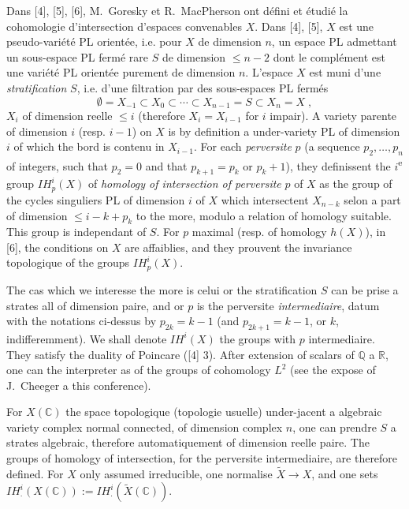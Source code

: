\documentclass[12pt,a4paper]{article}
\theoremstyle{plain}
\theoremstyle{definition}
\theoremstyle{remark}
\newcommand{\IH}{\mathit{IH}}
\newcommand{\CC}{\mathbb{C}}
\newcommand{\QQ}{\mathbb{Q}}
\newcommand{\RR}{\mathbb{R}}
\begin{document}
\medskip

Dans [4], [5], [6], M.~Goresky et R.~MacPherson ont défini et étudié la cohomologie d'intersection d'espaces convenables $X$. Dans [4], [5], $X$ est une pseudo-variété PL orientée, i.e. pour $X$ de dimension $n$, un espace PL admettant un sous-espace PL fermé rare $S$ de dimension $\leq n{-}2$ dont le complément est une variété PL orientée purement de dimension $n$. L'espace $X$ est muni d'une \emph{stratification} $S$, i.e. d'une filtration par des sous-espaces PL fermés
\[
\emptyset = X_{-1} \subset X_{0} \subset \cdots \subset X_{n-1} = S \subset X_{n} = X\;,
\]
$X_{i}$ of dimension reelle $\leq i$ (therefore $X_{i} = X_{i-1}$ for $i$ impair). A variety parente of dimension $i$ (resp. $i{-}1$) on $X$ is by definition a under-variety PL of dimension $i$ of which the bord is contenu in $X_{i-1}$. For each \emph{perversite} $p$ (a sequence $p_{2}, \dotsc, p_{n}$ of integers, such that $p_{2} = 0$ and that $p_{k+1} = p_{k}$ or $p_{k} {+} 1$), they definissent the $i$\textsuperscript{e} group $\IH^{i}_{p}(X)$ of \emph{homology of intersection of perversite} $p$ of $X$ as the group of the cycles singuliers PL of dimension $i$ of $X$ which intersectent $X_{n-k}$ selon a part of dimension $\leq i {-} k {+} p_{k}$ to the more, modulo a relation of homology suitable. This group is independant of $S$. For $p$ maximal (resp. of homology $h(X)$), in [6], the conditions on $X$ are affaiblies, and they prouvent the invariance topologique of the groups $\IH^{i}_{p}(X)$.

\medskip

The cas which we interesse the more is celui or the stratification $S$ can be prise a strates all of dimension paire, and or $p$ is the perversite \emph{intermediaire}, datum with the notations ci-dessus by $p_{2k} = k{-}1$ (and $p_{2k+1} = k-1$, or $k$, indifferemment). We shall denote $\IH^{i}(X)$ the groups with $p$ intermediaire. They satisfy the duality of Poincare ([4] 3). After extension of scalars of $\QQ$ a $\RR$, one can the interpreter as of the groups of cohomology $L^{2}$ (see the expose of J.~Cheeger a this conference).

\medskip

For $X(\CC)$ the space topologique (topologie usuelle) under-jacent a algebraic variety complex normal connected, of dimension complex $n$, one can prendre $S$ a strates algebraic, therefore automatiquement of dimension reelle paire. The groups of homology of intersection, for the perversite intermediaire, are therefore defined. For $X$ only assumed irreducible, one normalise $\tilde{X} \to X$, and one sets $\IH^{i}_{\cdot}(X(\CC)) := \IH^{i}_{\cdot}(\tilde{X}(\CC))$.
\end{document}
